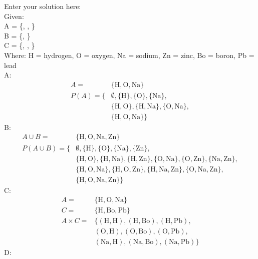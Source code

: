 \documentclass[10pt]{exam}
\begin{document}
\begin{questions}
\begin{solution}
    Enter your solution here: \\
    Given:\\
    A = \{, , \}\\
    B = \{, \}\\
    C = \{, , \}\\
    Where: H = hydrogen, O = oxygen, Na = sodium, Zn = zinc, Bo = boron, Pb = lead\\
    A:
    \begin{align*}
    A = &\{\text{H}, \text{O}, \text{Na}\}\\
    P(A) = \{&\emptyset, \{\text{H}\}, \{\text{O}\}, \{\text{Na}\}, \\
             &\{\text{H},\text{O}\}, \{\text{H},\text{Na}\}, \{\text{O},\text{Na}\}, \\
             &\{\text{H},\text{O},\text{Na}\}\}
    \end{align*}
    B:
    \begin{align*}
    A \cup B = &\{\text{H}, \text{O}, \text{Na}, \text{Zn}\}\\
    P(A\cup B) = \{&\emptyset, \{\text{H}\}, \{\text{O}\}, \{\text{Na}\}, \{\text{Zn}\}, \\
                   &\{\text{H},\text{O}\}, \{\text{H},\text{Na}\}, \{\text{H},\text{Zn}\}, 
                   \{\text{O},\text{Na}\}, \{\text{O},\text{Zn}\}, \{\text{Na},\text{Zn}\}, \\
                   &\{\text{H},\text{O},\text{Na}\}, \{\text{H},\text{O},\text{Zn}\}, 
                    \{\text{H},\text{Na},\text{Zn}\}, \{\text{O},\text{Na},\text{Zn}\}, \\
                   &\{\text{H},\text{O},\text{Na},\text{Zn}\}\}
    \end{align*}
    C:
    \begin{align*}
    A = &\{\text{H}, \text{O}, \text{Na}\}\\
    C = &\{\text{H}, \text{Bo}, \text{Pb}\}\\
    A \times C = & \{(\text{H},\text{H}),(\text{H},\text{Bo}),(\text{H},\text{Pb}), \\
                   &(\text{O},\text{H}),(\text{O},\text{Bo}),(\text{O},\text{Pb}), \\
                   &(\text{Na},\text{H}),(\text{Na},\text{Bo}),(\text{Na},\text{Pb})\}
    \end{align*}
    D:
    \begin{align*}

\end{align*}
\end{solution}
\end{questions}
\end{document}
